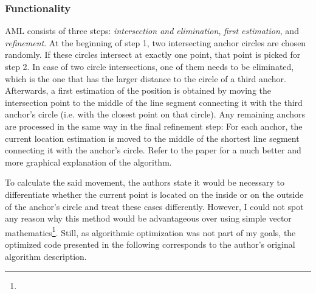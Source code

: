 \subsubsection{Functionality}
AML consists of three steps: \emph{intersection and elimination}, \emph{first estimation}, and \emph{refinement}. At the beginning of step 1, two intersecting anchor circles are chosen randomly. If these circles intersect at exactly one point, that point is picked for step 2. In case of two circle intersections, one of them needs to be eliminated, which is the one that has the larger distance to the circle of a third anchor. Afterwards, a first estimation of the position is obtained by moving the intersection point to the middle of the line segment connecting it with the third anchor's circle (i.e. with the closest point on that circle). 
Any remaining anchors are processed in the same way in the final refinement step: For each anchor, the current location estimation is moved to the middle of the shortest line segment connecting it with the anchor's circle. Refer to the paper for a much better and more graphical explanation of the algorithm.

To calculate the said movement, the authors state it would be necessary to differentiate whether the current point is located on the inside or on the outside of the anchor's circle and treat these cases differently. However, I could not spot any reason why this method would be advantageous over using simple vector mathematics\footnote{}. Still, as algorithmic optimization was not part of my goals, the optimized code presented in the following corresponds to the author's original algorithm description.

